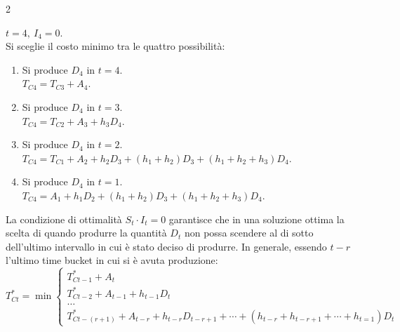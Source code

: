 \begin{multicols}{2}
    \begin{stepbox}
        $ t=4,~I_{4}=0 $.\\
        Si sceglie il costo minimo tra le quattro possibilità:
        \begin{enumerate}[label=\alph*)] %
            \item Si produce $ D_{4} $ in $ t=4 $. \\ $ T_{C4} = T_{C3} + A_{4} $.
            \item Si produce $ D_{4} $ in $ t=3 $. \\ $ T_{C4} = T_{C2} + A_{3} + h_{3}D_{4} $.
            \item Si produce $ D_{4} $ in $ t=2 $. \\ $ T_{C4} =  T_{C1} + A_{2} + h_{2}D_{3} + (h_{1}+h_{2})D_{3} + (h_{1}+h_{2}+h_{3})D_{4} $.
            \item Si produce $ D_{4} $ in $ t=1 $. \\ $ T_{C4} =  A_{1} + h_{1}D_{2} + (h_{1}+h_{2})D_{3} + (h_{1}+h_{2}+h_{3})D_{4} $.
        \end{enumerate}
    \end{stepbox}
\end{multicols}

La condizione di ottimalità $ S_{t} \cdot I_{t}=0 $ garantisce che in una soluzione ottima la scelta di quando produrre la quantità $ D_{t} $ non possa scendere al di sotto dell'ultimo intervallo in cui è stato deciso di produrre. In generale, essendo $ t-r $ l'ultimo time bucket in cui si è avuta produzione: %
\[
    T_{Ct}^{*} = \min \left\{
    \begin{array}{ll}
        T_{Ct-1}^{*} + A_{t}                  \\
        T_{Ct-2}^{*} + A_{t-1} + h_{t-1}D_{t} \\
        \dots                                 \\
        T_{Ct-(r+1)}^{*} + A_{t-r} + h_{t-r}D_{t-r+1} + \cdots + (h_{t-r}+h_{t-r+1}+\cdots+h_{t=1})D_{t}
    \end{array}
    \right.
\]